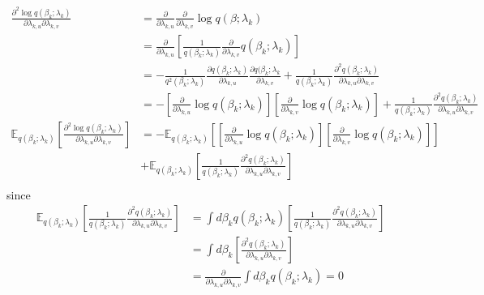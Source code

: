 \documentclass [12pt]{article}
\newcommand{\E}{\ensuremath{\mathbb{E}}}
\begin{document}
\begin{itemize}
\begin{align*}
    \frac{\partial^2 \log q(\beta_k ; \lambda_k)}{\partial \lambda_{k,u} \partial \lambda_{k,v}} &= \frac{\partial}{\partial \lambda_{k,u} } \frac{\partial}{\partial \lambda_{k,v}} \log q(\beta; \lambda_k) \\
    &= \frac{\partial}{\partial \lambda_{k,u} }\left [ \frac{1}{q(\beta_k; \lambda_k)} \frac{\partial}{\partial \lambda_{k,v}} q(\beta_k; \lambda_k)\right] \\
    &= - \frac{1}{q^2(\beta_k; \lambda_k)} \frac{\partial q(\beta_k; \lambda_k)}{\partial \lambda_{k,u}} \frac{\partial q(\beta_k; \lambda_k}{\partial \lambda_{k,v}} + \frac{1}{q(\beta_k; \lambda_k)} \frac{\partial^2 q(\beta_k; \lambda_k)}{\partial \lambda_{k,u} \partial \lambda_{k,v}} \\
    &= -\left[\frac{\partial }{\partial \lambda_{k,u}} \log q(\beta_k; \lambda_k)\right] \left[ \frac{\partial }{\partial \lambda_{k,v}} \log q(\beta_k; \lambda_k)\right] + \frac{1}{q(\beta_k; \lambda_k)} \frac{\partial^2 q(\beta_k; \lambda_k)}{\partial \lambda_{k,u} \partial \lambda_{k,v}} \\
    \E_{q(\beta_k; \lambda_k)} \left[ \frac{\partial^2 \log q(\beta_k ; \lambda_k)}{\partial \lambda_{k,u} \partial \lambda_{k,v}} \right] &= - \E_{q(\beta_k; \lambda_k)} \left[\left[\frac{\partial }{\partial \lambda_{k,u}} \log q(\beta_k; \lambda_k)\right] \left[ \frac{\partial }{\partial \lambda_{k,v}} \log q(\beta_k; \lambda_k)\right]  \right] \\ &+ \E_{q(\beta_k; \lambda_k)} \left[ \frac{1}{q(\beta_k; \lambda_k)} \frac{\partial^2 q(\beta_k; \lambda_k)}{\partial \lambda_{k,u} \partial \lambda_{k,v}} \right]  \\
\end{align*}
since 
\begin{align*}
     \E_{q(\beta_k; \lambda_k)} \left[ \frac{1}{q(\beta_k; \lambda_k)} \frac{\partial^2 q(\beta_k; \lambda_k)}{\partial \lambda_{k,u} \partial \lambda_{k,v}} \right] &= \int d\beta_k q(\beta_k; \lambda_k) \left[ \frac{1}{q(\beta_k; \lambda_k)} \frac{\partial^2 q(\beta_k; \lambda_k)}{\partial \lambda_{k,u} \partial \lambda_{k,v}} \right] \\
      &= \int d\beta_k \left[ \frac{\partial^2 q(\beta_k; \lambda_k)}{\partial \lambda_{k,u} \partial \lambda_{k,v}} \right] \\
      &= \frac{\partial}{\partial \lambda_{k,u} \partial \lambda_{k,v}} \int d\beta_k q(\beta_k; \lambda_k) = 0
\end{align*}


\end{itemize}
\end{document}
